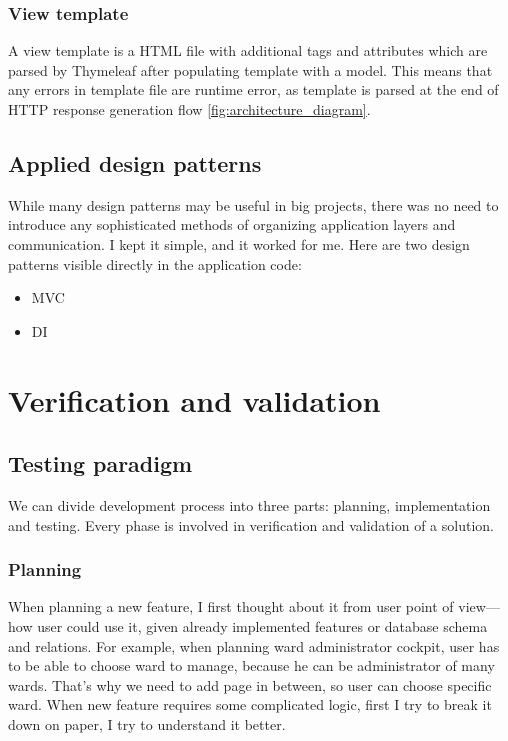 \documentclass[a4paper,twoside,12pt]{book}
\begin{document}
    \subsection{View template}
      A view template is a HTML file with additional tags and attributes which are parsed by Thymeleaf after populating template with a model.
      This means that any errors in template file are runtime error, as template is parsed at the end of HTTP response generation flow \ref{fig:architecture_diagram}.

  \section{Applied design patterns}
    While many design patterns may be useful in big projects, there was no need to introduce any sophisticated methods of organizing application layers and communication.
    I kept it simple, and it worked for me. Here are two design patterns visible directly in the application code:
    \begin{itemize}
      \item MVC
      \item DI
    \end{itemize}

\chapter{Verification and validation}
  \section{Testing paradigm}
    We can divide development process into three parts: planning, implementation and testing. Every phase is involved in verification and validation of a solution.
      \subsection{Planning}
        When planning a new feature, I first thought about it from user point of view---how user could use it, given already implemented features or database schema and relations.
        For example, when planning ward administrator cockpit, user has to be able to choose ward to manage, because he can be administrator of many wards.
        That's why we need to add page in between, so user can choose specific ward.
        When new feature requires some complicated logic, first I try to break it down on paper, I try to understand it better.
\end{document}
